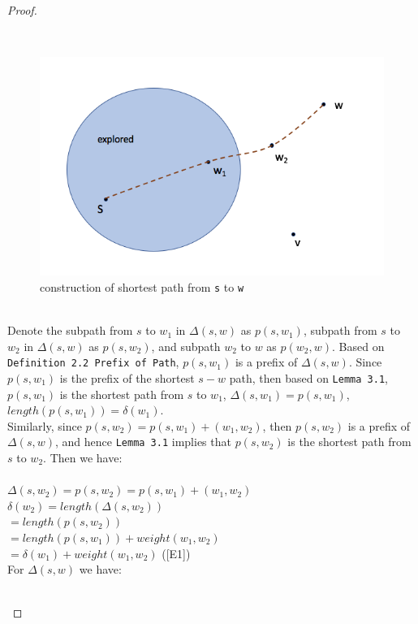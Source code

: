 \begin{proof}
\begin{itemize}
  \\
  \begin{figure}
  \centering
  \includegraphics[scale = 0.45]{pic.png}
  \caption{construction of shortest path from \texttt{s} to \texttt{w}}
  \end{figure}
  \tab\\
  Denote the subpath from $s$ to $w_1$ in $\Delta(s, w)$ as $p(s, w_1)$, subpath from $s$ to $w_2$ in $\Delta(s, w)$ as $p(s, w_2)$, and subpath $w_2$ to $w$ as $p(w_2, w)$. Based on \texttt{Definition 2.2 Prefix of Path}, $p(s, w_1)$ is a prefix of $\Delta(s, w)$. Since $p(s, w_1)$ is the prefix of the shortest $s-w$ path, then based on \texttt{Lemma 3.1}, $p(s, w_1)$ is the shortest path from $s$ to $w_1$, $\Delta(s, w_1) = p(s, w_1)$, $length(p(s, w_1)) = \delta(w_1)$. 
  \\
  Similarly, since $p(s, w_2) = p(s, w_1) + (w_1, w_2)$, then $p(s, w_2)$ is a prefix of $\Delta(s, w)$, and hence \texttt{Lemma 3.1} implies that $p(s, w_2)$ is the shortest path from $s$ to $w_2$. Then we have: 
  \\\\
  \ftab $\Delta(s, w_2) = p(s, w_2) = p(s, w_1) + (w_1, w_2)$ \\
  \ftab $\delta(w_2) = length(\Delta(s, w_2))$ \\
  \ftab\tab $= length(p(s, w_2))$ \\
  \ftab\tab $= length(p(s, w_1)) + weight(w_1, w_2)$\\
  \ftab\tab $= \delta(w_1) + weight(w_1, w_2)$ ([E1])
  \\
  For $\Delta(s, w)$ we have: 
  \\\\

\end{itemize}
\end{proof}

